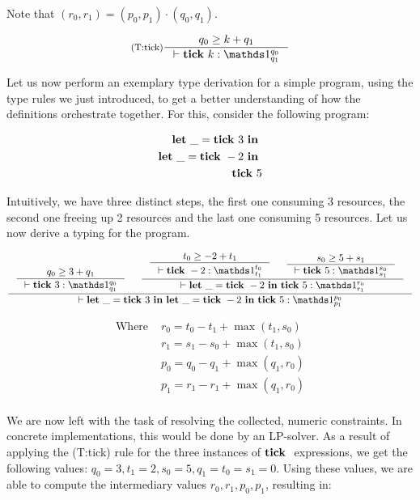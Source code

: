 \begin{remark}
   Note that \((r_0, r_1) = (p_0, p_1) \cdot (q_0, q_1)\).
\end{remark}

\[
   \label{def:tr-tick-4}
   \inference[(T:tick)]
   {q_0 \geq k + q_1}
   {\typing{}{\tick{k}}{\ratype{\unit}{q_0}{q_1}}}
\]


Let us now perform an exemplary type derivation for a simple program, using the type rules we just introduced, to get a better understanding of how the definitions orchestrate together. For this, consider the following program:

\begin{example}
   \begin{align*}
   \mathbf{let}~\_ = \mathbf{tick}~3~\mathbf{in}~ \\
   \mathbf{let}~\_ = \mathbf{tick}~-2~\mathbf{in}~ \\
   \mathbf{tick}~5
   \end{align*}
\end{example}

Intuitively, we have three distinct steps, the first one consuming 3 resources, the second one freeing up 2 resources and the last one consuming 5 resources. Let us now derive a typing for the program.

\[
   \inference
   {
      \inference
      {q_0 \geq 3 + q_1}
      {\typing{}{\tick{3}}{\ratype{\unit}{q_0}{q_1}}}
       &
      \inference
      {
         \inference
         {t_0 \geq -2 + t_1}
         {\typing{}{\tick{-2}}{\ratype{\unit}{t_0}{t_1}}}
          &
         \inference
         {s_0 \geq 5 + s_1}
         {\typing{}{\tick{5}}{\ratype{\unit}{s_0}{s_1}}}
      }
      {\typing{}{\letexp{\_}{\tick{-2}}{\tick{5}}}{\ratype{\unit}{r_0}{r_1}}}
   }
   {\typing{}{\letexp{\_}{\tick{3}}{\letexp{\_}{\tick{-2}}{\tick{5}}}}{\ratype{\unit}{p_0}{p_1}}}
\]

\begin{align*}
   \text{Where }  & r_0 = t_0 - t_1 + \max(t_1, s_0) \\
                  & r_1 = s_1 - s_0 + \max(t_1, s_0) \\
                  & p_0 = q_0 - q_1 + \max(q_1, r_0) \\
                  & p_1 = r_1 - r_1 + \max(q_1, r_0) \\
\end{align*}


We are now left with the task of resolving the collected, numeric constraints. In concrete implementations, this would be done by an LP-solver. As a result of applying the (T:tick) rule for the three instances of \(\mathbf{tick}~\) expressions, we get the following values: \(q_0 = 3, t_1 = 2, s_0 = 5, q_1 = t_0 = s_1 = 0\). Using these values, we are able to compute the intermediary values \(r_0, r_1, p_0, p_1\), resulting in:


